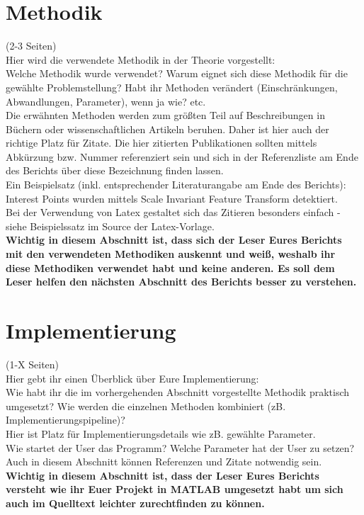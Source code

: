\documentclass[paper=A4, deutsch]{scrartcl}
\begin{document}
\section{Methodik}
(2-3 Seiten)\\
Hier wird die verwendete Methodik in der Theorie vorgestellt:\\
Welche Methodik wurde verwendet? Warum eignet sich diese Methodik für die gewählte Problemstellung? Habt ihr Methoden verändert (Einschränkungen, Abwandlungen, Parameter), wenn ja wie? etc.\\
Die erwähnten Methoden werden zum größten Teil auf Beschreibungen in Büchern oder wissenschaftlichen Artikeln beruhen. Daher ist hier auch der richtige Platz für Zitate. Die hier zitierten Publikationen sollten mittels Abkürzung bzw. Nummer referenziert sein und sich in der Referenzliste am Ende des Berichts über diese Bezeichnung finden lassen.\\
Ein Beispielsatz (inkl. entsprechender Literaturangabe am Ende des Berichts): Interest Points wurden mittels Scale Invariant Feature Transform \cite{lowe2004} detektiert.\\
Bei der Verwendung von Latex gestaltet sich das Zitieren besonders einfach - siehe Beispielssatz im Source der Latex-Vorlage.\\
\textbf{Wichtig in diesem Abschnitt ist, dass sich der Leser Eures Berichts mit den verwendeten Methodiken auskennt und weiß, weshalb ihr diese Methodiken verwendet habt und keine anderen. Es soll dem Leser helfen den nächsten Abschnitt des Berichts besser zu verstehen.}

\section{Implementierung}
(1-X Seiten)\\
Hier gebt ihr einen Überblick über Eure Implementierung:\\
Wie habt ihr die im vorhergehenden Abschnitt vorgestellte Methodik praktisch umgesetzt? Wie werden die einzelnen Methoden kombiniert (zB. Implementierungspipeline)?\\
Hier ist Platz für Implementierungsdetails wie zB. gewählte Parameter. \\
Wie startet der User das Programm? Welche Parameter hat der User zu setzen?\\
Auch in diesem Abschnitt können Referenzen und Zitate notwendig sein.\\
\textbf{Wichtig in diesem Abschnitt ist, dass der Leser Eures Berichts versteht wie ihr Euer Projekt in MATLAB umgesetzt habt um sich auch im Quelltext leichter zurechtfinden zu können.}
\end{document}
